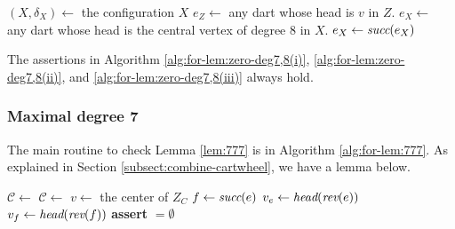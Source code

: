 \documentclass[main.tex]{subfiles}
\begin{document}
\begin{algorithm}
    \caption{\containXWithLink($(Z, \delta^-, \delta^+), v$)}
    \label{alg:contain_X}
    \begin{algorithmic}[1]
        \State $(X, \delta_X) \gets$ the configuration $X$
        \State $e_Z \gets$ any dart whose head is $v$ in $Z$.
        \State $e_X \gets$ any dart whose head is the central vertex of degree $8$ in $X$.
                \State \Return \True
            \EndIf
            \State $e_X \gets \textit{succ}(e_X)$
        \EndFor
        \State \Return \False
    \end{algorithmic}
\end{algorithm}

\begin{lem}
\label{lem:comp-check-deg8}
    The assertions in Algorithm \ref{alg:for-lem:zero-deg7,8(i)}, \ref{alg:for-lem:zero-deg7,8(ii)}, and \ref{alg:for-lem:zero-deg7,8(iii)} always hold.
\end{lem}

\subsubsection{Maximal degree 7}
The main routine to check Lemma \ref{lem:777} is \checkStriangle in Algorithm \ref{alg:for-lem:777}.  As explained in Section \ref{subsect:combine-cartwheel}, we have a lemma below. 

\begin{algorithm}[H]
    \caption{\checkStriangleWithLink($\mathcal{C}_{\textsf{all}}, \bar{\mathcal{D}}$) - Lemma \ref{lem:777}}
    \label{alg:for-lem:777}
    \begin{algorithmic}[1]
        \State $\mathcal{C} \gets$ 
        \State $\mathcal{C} \gets$ 
            \State $v \gets$ the center of $Z_C$
                \State $f \gets \textit{succ}(e)$
                \State $v_e \gets \textit{head}(\textit{rev}(e))$
                \State $v_f \gets \textit{head}(\textit{rev}(f))$
                    \State \textbf{assert}  $= \emptyset$
                \EndIf
            \EndFor
        \EndFor
    \end{algorithmic}
\end{algorithm}
\end{document}
